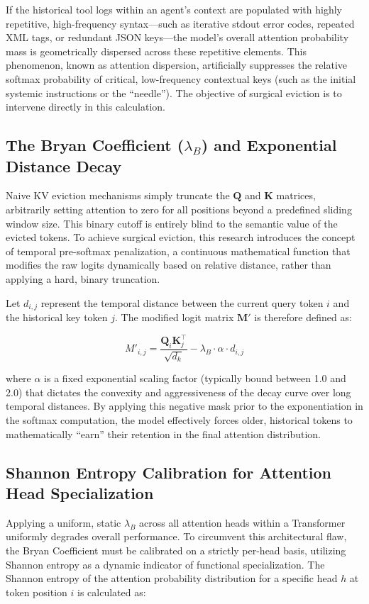 \documentclass[11pt,a4paper]{article}
\newcommand{\bryanCoeff}{\lambda_B}
\begin{document}
If the historical tool logs within an agent's context are populated with highly repetitive, high-frequency syntax---such as iterative stdout error codes, repeated XML tags, or redundant JSON keys---the model's overall attention probability mass is geometrically dispersed across these repetitive elements. This phenomenon, known as attention dispersion, artificially suppresses the relative softmax probability of critical, low-frequency contextual keys (such as the initial systemic instructions or the ``needle''). The objective of surgical eviction is to intervene directly in this calculation.

\subsection{The Bryan Coefficient (\(\bryanCoeff\)) and Exponential Distance Decay}
Naive KV eviction mechanisms simply truncate the \(\mathbf{Q}\) and \(\mathbf{K}\) matrices, arbitrarily setting attention to zero for all positions beyond a predefined sliding window size. This binary cutoff is entirely blind to the semantic value of the evicted tokens. To achieve surgical eviction, this research introduces the concept of temporal pre-softmax penalization, a continuous mathematical function that modifies the raw logits dynamically based on relative distance, rather than applying a hard, binary truncation.

Let \(d_{i,j}\) represent the temporal distance between the current query token \(i\) and the historical key token \(j\). The modified logit matrix \(\mathbf{M}'\) is therefore defined as:

\[
M'_{i,j} = \frac{\mathbf{Q}_i \mathbf{K}_j^\top}{\sqrt{d_k}} - \bryanCoeff \cdot \alpha \cdot d_{i,j}
\]

where \(\alpha\) is a fixed exponential scaling factor (typically bound between 1.0 and 2.0) that dictates the convexity and aggressiveness of the decay curve over long temporal distances. By applying this negative mask prior to the exponentiation in the softmax computation, the model effectively forces older, historical tokens to mathematically ``earn'' their retention in the final attention distribution.

\subsection{Shannon Entropy Calibration for Attention Head Specialization}
Applying a uniform, static \(\bryanCoeff\) across all attention heads within a Transformer uniformly degrades overall performance. To circumvent this architectural flaw, the Bryan Coefficient must be calibrated on a strictly per-head basis, utilizing Shannon entropy as a dynamic indicator of functional specialization. The Shannon entropy of the attention probability distribution for a specific head \(h\) at token position \(i\) is calculated as:
\end{document}
